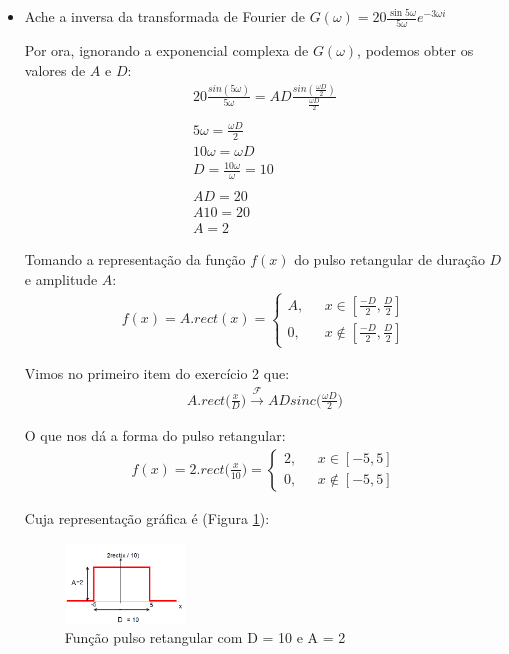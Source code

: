 \documentclass[12pt]{article}
\begin{document}
\begin{itemize}
\begin{itemize}
\item Ache a inversa da transformada de Fourier de $G(\omega) =
  20\frac{\sin 5\omega}{5\omega}e^{-3\omega i}$

Por ora, ignorando a exponencial complexa de $G(\omega)$, podemos obter os valores de $A$ e $D$:
\begin{align*}
    20\frac{sin(5\omega)}{5\omega} = AD\frac{sin(\frac{\omega D}{2})}{\frac{\omega D}{2}} \\
    \\ 5\omega = \frac{\omega D}{2} \\
    10\omega = \omega D \\
    D = \frac{10\omega}{\omega} = 10 \\
    \\ AD = 20 \\
    A10 = 20 \\
    A = 2
\end{align*}

Tomando a representação da função $f(x)$ do pulso retangular de duração $D$ e amplitude $A$:
\begin{align*}
f(x) = A . rect(x) = \left\{ \begin{array}{rl}
 A, &\mbox{ $x \in  [\frac{-D}{2}, \frac{D}{2}]$} \\
 0, &\mbox{ $x \notin [\frac{-D}{2}, \frac{D}{2}]$}
       \end{array} \right.
\end{align*}

Vimos no primeiro item do exercício 2 que:
\begin{align*}
 A . rect\bigg(\frac{x}{D}\bigg) \xrightarrow{\mathscr{F}} ADsinc \bigg(\frac{\omega D}{2}\bigg)
\end{align*}

O que nos dá a forma do pulso retangular:
\begin{align*}
f(x) = 2 . rect\bigg(\frac{x}{10}\bigg) = \left\{ \begin{array}{rl} 
 2, &\mbox{ $x \in  [-5, 5]$} \\
 0, &\mbox{ $x \notin [-5, 5]$}
       \end{array} \right.
\end{align*}

Cuja representação gráfica é (Figura \ref{fig:fig3}):
\begin{figure}[H]
    \centering
    \includegraphics[width=0.3\textwidth]{Q3Images/pulse_function_2.png}
    \caption{Função pulso retangular com D = 10 e A = 2}
    \label{fig:fig3}
\end{figure}


\end{itemize}
\end{itemize}
\end{document}
